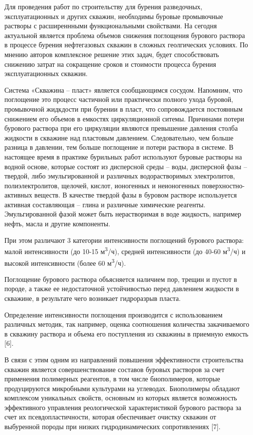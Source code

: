 Для проведения работ по строительству для бурения разведочных,
эксплуатационных и других скважин, необходимы буровые промывочные
растворы с расширеннными функциональными свойствами. На сегодня
актуальной является проблема объемов снижения поглощения бурового
раствора в процессе бурения нефтегазовых скважин в сложных геолгических
условиях. По мнению авторов комплексное решение этих задач, будет
способствовать снижению затрат на сокращение сроков и стоимости процесса
бурения эксплуатационных скважин.

Система «Скважина -- пласт» является сообщающимся сосудом. Напомним, что
поглощение это процесс частичной или практически полного ухода буровой,
промывочной жидкдости при бурении в пласт, что сопровождается постоянным
снижением его объемов в емкостях циркуляционной ситемы. Причинами потери
бурового раствора при его циркуляции являются превышение давления столба
жидкости в скважине над пластовым давлением. Следовательно, чем больше
разница в давлении, тем больше поглощение и потери раствора в системе. В
настоящее время в практике бурильных работ используют буровые растворы
на водной основе, которые состоят из дисперсной среды -- воды,
дисперсной фазы -- твердой, либо эмульгированной и различных
водорастворимых электролитов, полиэлектролитов, щелочей, кислот,
ионогенных и неионогенных поверхностно-активных веществ. В качестве
твердой фазы в буровом растворе используется активная составляющая --
глина и различные химические реагенты. Эмульгированной фазой может быть
нерастворимая в воде жидкость, например нефть, масла и другие
компоненты.

При этом различают 3 категории интенсивности поглощений бурового
раствора: малой интенсивности (до 10-15 м\textsuperscript{3}/ч), средней
интенсивности (до 40-60 м\textsuperscript{3}/ч) и высокой интенсивности
(более 60 м\textsuperscript{3}/ч).

Поглощение бурового раствора объясняется наличием пор, трещин и пустот в
породе, а также ее недостаточной устойчивостью перед давлением жидкости
в скважине, в результате чего возникает гидроразрыв пласта.

Определение интенсивности поглощения производится с использованием
различных методик, так например, оценка соотношения количества
закачиваемого в скважину раствора и объема его поступления из скважины в
приемную емкость {[}6{]}.

В связи с этим одним из направлений повышения эффективности
строительства скважин является совершенствование составов буровых
растворов за счет применения полимерных реагентов, в том числе
биополимеров, которые продуцируются микробными культурами на углеводах.
Биополимеры обладают комплексом уникальных свойств, основным из которых
является возможность эффективного управления реологической
характеристикой бурового раствора за счет их псевдопластичности, которая
обеспечивает очистку скважин от выбуренной породы при низких
гидродинамических сопротивлениях {[}7{]}.~

